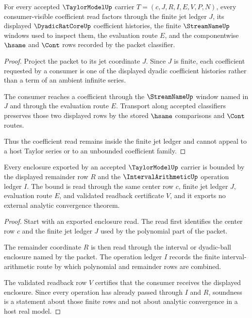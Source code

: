 \begin{theorem}
\label{thm:taylormodel-finite-jet-transport}
For every accepted $\TaylorModelUp$ carrier $T=(c,J,R,I,E,V,P,N)$, every consumer-visible coefficient read factors through the finite jet ledger $J$, its displayed $\DyadicRatCoreUp$ coefficient histories, the finite $\StreamNameUp$ windows used to inspect them, the evaluation route $E$, and the componentwise $\hsame$ and $\Cont$ rows recorded by the packet classifier.
\end{theorem}
\begin{proof}
Project the packet to its jet coordinate $J$. Since $J$ is finite, each coefficient requested by a consumer is one of the displayed dyadic coefficient histories rather than a term of an ambient infinite series.

The consumer reaches a coefficient through the $\StreamNameUp$ window named in $J$ and through the evaluation route $E$. Transport along accepted classifiers preserves those two displayed rows by the stored $\hsame$ comparisons and $\Cont$ routes.

Thus the coefficient read remains inside the finite jet ledger and cannot appeal to a host Taylor series or to an unbounded coefficient family.
\end{proof}

\begin{theorem}
\label{thm:taylormodel-interval-remainder-soundness}
Every enclosure exported by an accepted $\TaylorModelUp$ carrier is bounded by the displayed remainder row $R$ and the $\IntervalArithmeticUp$ operation ledger $I$. The bound is read through the same center row $c$, finite jet ledger $J$, evaluation route $E$, and validated readback certificate $V$, and it exports no external analytic convergence theorem.
\end{theorem}
\begin{proof}
Start with an exported enclosure read. The read first identifies the center row $c$ and the finite jet ledger $J$ used by the polynomial part of the packet.

The remainder coordinate $R$ is then read through the interval or dyadic-ball enclosure named by the packet. The operation ledger $I$ records the finite interval-arithmetic route by which polynomial and remainder rows are combined.

The validated readback row $V$ certifies that the consumer receives the displayed enclosure. Since every operation has already passed through $I$ and $R$, soundness is a statement about those finite rows and not about analytic convergence in a host real model.
\end{proof}

